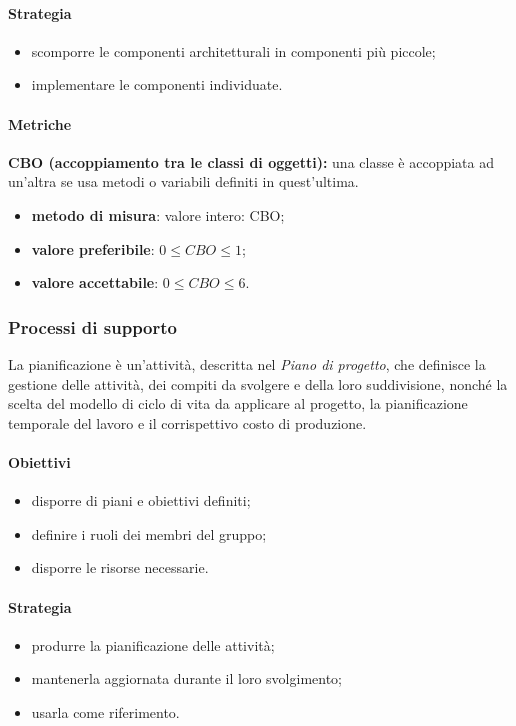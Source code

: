 \paragraph{Strategia}
\begin{itemize}
    \item scomporre le componenti architetturali in componenti più piccole;
    \item implementare le componenti individuate.
\end{itemize}
\paragraph{Metriche}
\textbf{CBO (accoppiamento tra le classi di oggetti):} una classe è accoppiata ad un'altra se usa metodi o variabili definiti in quest'ultima.
\begin{itemize}
    \item \textbf{metodo di misura}: valore intero: CBO;
    \item \textbf{valore preferibile}: $0 \leq CBO \leq 1$;
    \item \textbf{valore accettabile}: $0 \leq CBO \leq 6$.
\end{itemize}
\subsubsection{Processi di supporto}
La pianificazione è un'attività, descritta nel \textit{Piano di progetto}, che definisce la gestione delle  attività, dei compiti da svolgere e della loro suddivisione, nonché la scelta
del modello di ciclo di vita da applicare al progetto, la pianificazione temporale del lavoro e il corrispettivo costo di produzione.
\paragraph{Obiettivi}
\begin{itemize}
    \item disporre di piani e obiettivi  definiti;
    \item definire i ruoli dei membri del gruppo;
    \item disporre le risorse necessarie.
\end{itemize}
\paragraph{Strategia}
\begin{itemize}
    \item produrre la pianificazione delle attività;
    \item mantenerla aggiornata durante il loro svolgimento;
    \item usarla come riferimento.
\end{itemize}
